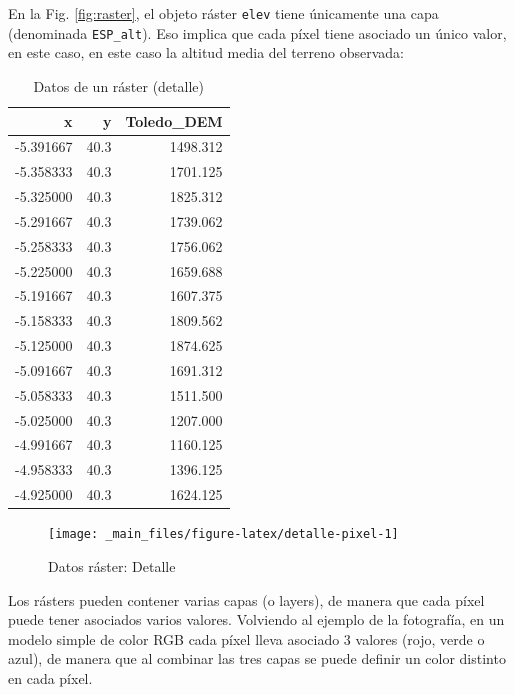 \documentclass[
]{report}
\begin{document}
En la Fig. \ref{fig:raster}, el objeto ráster \texttt{elev} tiene únicamente una capa
(denominada \texttt{ESP\_alt}). Eso implica que cada píxel tiene asociado un único
valor, en este caso, en este caso la altitud media del terreno observada:

\begin{table}

\caption{\label{tab:detalle-pixel}Datos de un ráster (detalle)}
\centering
\begin{tabular}[t]{r|r|r}
\hline
x & y & Toledo\_DEM\\
\hline
-5.391667 & 40.3 & 1498.312\\
\hline
-5.358333 & 40.3 & 1701.125\\
\hline
-5.325000 & 40.3 & 1825.312\\
\hline
-5.291667 & 40.3 & 1739.062\\
\hline
-5.258333 & 40.3 & 1756.062\\
\hline
-5.225000 & 40.3 & 1659.688\\
\hline
-5.191667 & 40.3 & 1607.375\\
\hline
-5.158333 & 40.3 & 1809.562\\
\hline
-5.125000 & 40.3 & 1874.625\\
\hline
-5.091667 & 40.3 & 1691.312\\
\hline
-5.058333 & 40.3 & 1511.500\\
\hline
-5.025000 & 40.3 & 1207.000\\
\hline
-4.991667 & 40.3 & 1160.125\\
\hline
-4.958333 & 40.3 & 1396.125\\
\hline
-4.925000 & 40.3 & 1624.125\\
\hline
\end{tabular}
\end{table}

\begin{figure}

{\centering \texttt{[image: \_main\_files/figure-latex/detalle-pixel-1]} 

}

\caption{Datos ráster: Detalle}\label{fig:detalle-pixel}
\end{figure}

Los rásters pueden contener varias capas (o layers), de manera que cada píxel
puede tener asociados varios valores. Volviendo al ejemplo de la fotografía, en
un modelo simple de color RGB cada píxel lleva asociado 3 valores (rojo, verde o
azul), de manera que al combinar las tres capas se puede definir un color
distinto en cada píxel.
\end{document}
